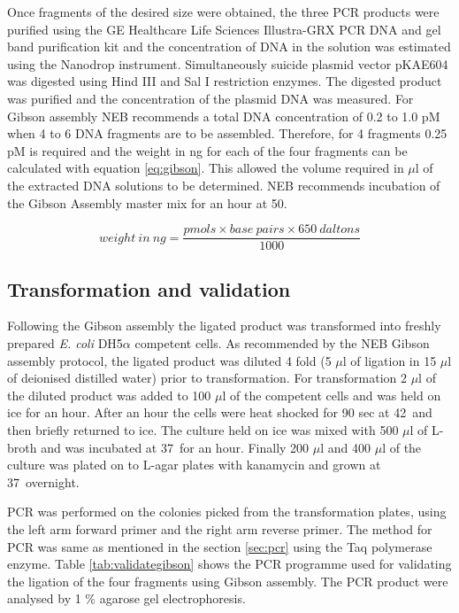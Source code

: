 		Once fragments of the desired size were obtained, the three PCR products were purified using the GE Healthcare Life Sciences Illustra-GRX PCR DNA and gel band purification kit and the concentration of DNA in the solution was estimated using the Nanodrop instrument. Simultaneously suicide plasmid vector pKAE604 was digested using Hind III and Sal I restriction enzymes. The digested product was purified and the concentration of the plasmid DNA was measured. For Gibson assembly NEB recommends a total DNA concentration of 0.2 to 1.0 pM when 4 to 6 DNA fragments are to be assembled. Therefore, for 4 fragments 0.25 pM is required and the weight in ng for each of the four fragments can be calculated with equation \ref{eq:gibson}. This allowed the volume required in $ \mu $l of the extracted DNA solutions to be determined. NEB recommends incubation of the Gibson Assembly master mix for an hour at 50\textcelsius.
		
		\begin{equation}
		\label{eq:gibson}
			weight \ in \ ng = \frac{pmols \times base \ pairs \times 650 \ daltons}{1000}
		\end{equation}
		
		\subsection{Transformation and validation}
		\label{sec:transformation}
		Following the Gibson assembly the ligated product was transformed into freshly prepared \textit{E. coli} DH5$ \alpha $ competent cells. As recommended by the NEB Gibson assembly protocol, the ligated product was diluted 4 fold (5 $ \mu $l of ligation in 15 $ \mu $l of deionised distilled water) prior to transformation. For transformation 2  $ \mu $l of the diluted product was added to 100  $ \mu $l of the competent cells and was held on ice for an hour. After an hour the cells were heat shocked for 90 sec at 42\textcelsius \ and then briefly returned to ice. The culture held on ice was mixed with 500  $ \mu $l of L-broth and was incubated at 37\textcelsius \ for an hour. Finally 200  $ \mu $l and 400  $ \mu $l of the culture was plated on to L-agar plates with kanamycin and grown at 37\textcelsius \ overnight.
		
		PCR was performed on the colonies picked from the transformation plates, using the left arm forward primer and the right arm reverse primer. The method for PCR was same as mentioned in the section \ref{sec:pcr} using the Taq polymerase enzyme. Table \ref{tab:validategibson} shows the PCR programme used for validating the ligation of the four fragments using Gibson assembly. The PCR product were analysed by 1 \% agarose gel electrophoresis. 

